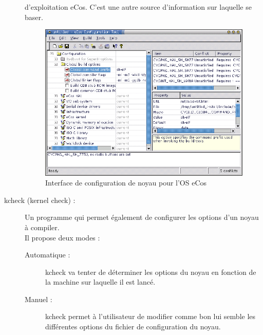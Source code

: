 ﻿\documentclass[17pts]{report}
\begin{document}
\begin{description}
        d’exploitation eCos. C’est une autre source d’information
        sur laquelle se baser. \\
        \begin{figure}[H]
            \includegraphics[scale=1.2]{illustrations/eCos_config.png}
            \centering
            \caption{Interface de configuration de noyau pour l'OS eCos}
            \label{fig:InterfaceEcos}
        \end{figure}
        \pagebreak
    \item[kcheck (kernel check) :]Un programme qui permet également de configurer les options
        d’un noyau à compiler. \\
        Il propose deux modes :
    \begin{description}
        \item[Automatique :] kcheck va tenter de déterminer les options du noyau
            en fonction de la machine sur laquelle il est lancé.
        \item[Manuel :] kcheck permet à l’utilisateur de modifier comme bon lui
            semble les différentes options du fichier de configuration du noyau.
    \end{description}
        \begin{figure}[H]

\end{figure}
\end{description}
\end{document}
